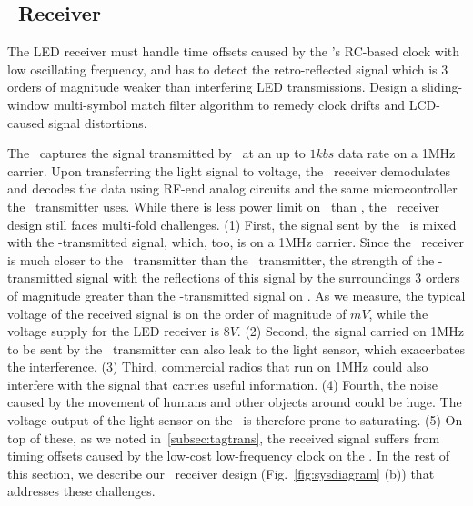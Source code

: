 \subsection{\reader\ Receiver}
\label{subsec:LEDreceiver}

\begin{tcolorbox}
\vskip 0.05in The LED receiver must handle time offsets caused by the \vitag's RC-based clock with low oscillating frequency, and has to detect the retro-reflected signal which is 3 orders of magnitude weaker than interfering LED transmissions.   
\vskip 0.05in Design a sliding-window multi-symbol match filter algorithm to remedy clock drifts and LCD-caused signal distortions.
\end{tcolorbox}

The \reader\ captures the signal transmitted by \vitag\ at an up to $1kbs$ data rate on a 1MHz carrier. Upon transferring the light signal to voltage, the \reader\ receiver demodulates and decodes the data using RF-end analog circuits and the same microcontroller the \reader\ transmitter uses. While there is less power limit on \reader\ than \vitag, the \reader\ receiver design still faces multi-fold challenges. (1) First, the signal sent by the \vitag\ is mixed with the \reader-transmitted signal, which, too, is on a 1MHz carrier. Since the \reader\ receiver is much closer to the \reader\ transmitter than the \vitag\ transmitter, the strength of the \reader-transmitted signal with the reflections of this signal by the surroundings 3 orders of magnitude greater than the \vitag-transmitted signal on \reader. As we measure, the typical voltage of the received signal is on the order of magnitude of $mV$, while the voltage supply for the LED receiver is $8V$. (2) Second, the signal carried on 1MHz to be sent by the \reader\ transmitter can also leak to the light sensor, which exacerbates the interference. (3) Third, commercial radios that run on 1MHz could also interfere with the signal that carries useful information. (4) Fourth, the noise caused by the movement of humans and other objects around could be huge. The voltage output of the light sensor on the \reader\ is therefore prone to saturating. (5) On top of these, as we noted in~\ref{subsec:tagtrans}, the received signal suffers from timing offsets caused by the low-cost low-frequency clock on the \vitag. In the rest of this section, we describe our \reader\ receiver design (Fig.~\ref{fig:sysdiagram} (b)) that addresses these challenges.


